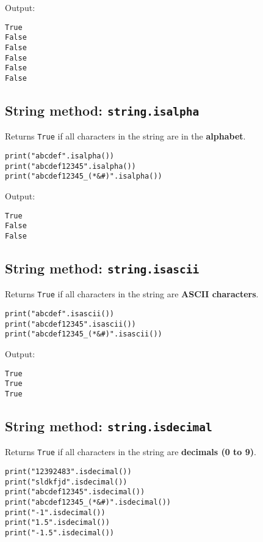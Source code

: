\documentclass[11pt]{article}
\begin{document}
 \noindent Output:

\begin{verbatim}
True
False
False
False
False
False
\end{verbatim}

\subsection{String method: \texttt{string.isalpha}}
\label{sec:orgb8a76bd}
Returns \texttt{True} if all characters in the string are in the \textbf{alphabet}.

\begin{verbatim}
print("abcdef".isalpha())
print("abcdef12345".isalpha())
print("abcdef12345_(*&#)".isalpha())
\end{verbatim}

 \noindent Output:

\begin{verbatim}
True
False
False
\end{verbatim}


 \newpage

\subsection{String method: \texttt{string.isascii}}
\label{sec:orge7b6ba8}
Returns \texttt{True} if all characters in the string are \textbf{ASCII characters}.

\begin{verbatim}
print("abcdef".isascii())
print("abcdef12345".isascii())
print("abcdef12345_(*&#)".isascii())
\end{verbatim}

 \noindent Output:

\begin{verbatim}
True
True
True
\end{verbatim}

\subsection{String method: \texttt{string.isdecimal}}
\label{sec:org4f32b34}
Returns \texttt{True} if all characters in the string are \textbf{decimals (0 to 9)}.

\begin{verbatim}
print("12392483".isdecimal())
print("sldkfjd".isdecimal())
print("abcdef12345".isdecimal())
print("abcdef12345_(*&#)".isdecimal())
print("-1".isdecimal())
print("1.5".isdecimal())
print("-1.5".isdecimal())
\end{verbatim}
\end{document}

